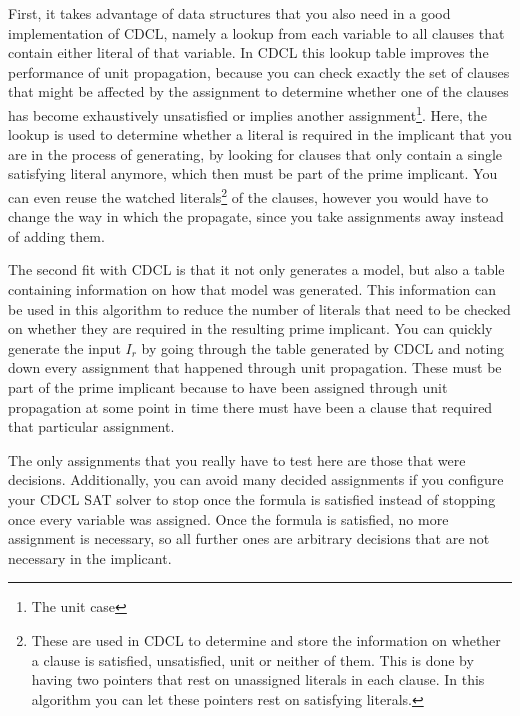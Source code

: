 First, it takes advantage of data structures that you also need in a good implementation of CDCL, namely a lookup from each variable to all clauses that contain either literal of that variable. In CDCL this lookup table improves the performance of unit propagation, because you can check exactly the set of clauses that might be affected by the assignment to determine whether one of the clauses has become exhaustively unsatisfied or implies another assignment\footnote{The unit case}. Here, the lookup is used to determine whether a literal is required in the implicant that you are in the process of generating, by looking for clauses that only contain a single satisfying literal anymore, which then must be part of the prime implicant. You can even reuse the watched literals\footnote{
	These are used in CDCL to determine and store the information on whether a clause is satisfied, unsatisfied, unit or neither of them. This is done by having two pointers that rest on unassigned literals in each clause. In this algorithm you can let these pointers rest on satisfying literals.}
 of the clauses, however you would have to change the way in which the propagate, since you take assignments away instead of adding them.

The second fit with CDCL is that it not only generates a model, but also a table containing information on how that model was generated. This information can be used in this algorithm to reduce the number of literals that need to be checked on whether they are required in the resulting prime implicant. You can quickly generate the input $I_r$ by going through the table generated by CDCL and noting down every assignment that happened through unit propagation. These must be part of the prime implicant because to have been assigned through unit propagation at some point in time there must have been a clause that required that particular assignment. 


The only assignments that you really have to test here are those that were decisions. Additionally, you can avoid many decided assignments if you configure your CDCL SAT solver to stop once the formula is satisfied instead of stopping once every variable was assigned. Once the formula is satisfied, no more assignment is necessary, so all further ones are arbitrary decisions that are not necessary in the implicant. 

